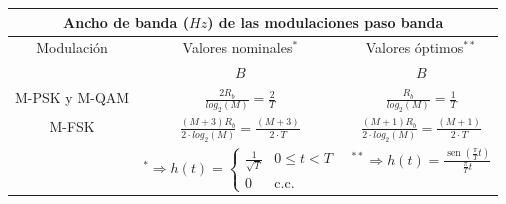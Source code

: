 \documentclass[es]{article}
\DeclareMathOperator{\sen}{sen}
\begin{document}
\begin{center}
        \renewcommand{\arraystretch}{2}
        \begin{tabular}{|c|c|c|}
            \multicolumn{3}{c}{{\bf Ancho de banda ($Hz$) de las modulaciones paso banda }} \\
            \hline
            \multirow{2}{*}{Modulación} & Valores nominales$^*$ & Valores óptimos$^{**}$ \\
            \cline{2-3}
            & $B$ & $B$ \\
            \hline
            M-PSK y M-QAM & $\displaystyle\frac{2 R_b}{log_2(M)} = \displaystyle\frac{2}{T}$ & $\displaystyle\frac{R_b}{log_2(M)} = \displaystyle\frac{1}{T}$ \\[1ex]
            \hline
            M-FSK & $\displaystyle\frac{(M+3) R_b}{2 \cdot log_2(M)} = \displaystyle\frac{(M+3)}{2\cdot T}$ & $\displaystyle\frac{(M+1) R_b}{2 \cdot log_2(M)} = \displaystyle\frac{(M+1)}{2\cdot T}$ \\[1ex]
            \hline
            & $^* \Rightarrow h(t) = \left \{ \begin{array}{lc} \displaystyle\frac{1}{\sqrt{T}} & 0\leq t < T \\ 0 & \text{c.c.} \end{array}\right. $ & $^{**} \Rightarrow h(t) = \displaystyle\frac{\sen\left ( \displaystyle\frac{\pi}{T} t \right ) }{\displaystyle\frac{\pi}{T}t}$ \\
            \hline
        \end{tabular}
        \renewcommand{\arraystretch}{1}
        \vspace{0.5cm}
    

\end{center}
\end{document}
